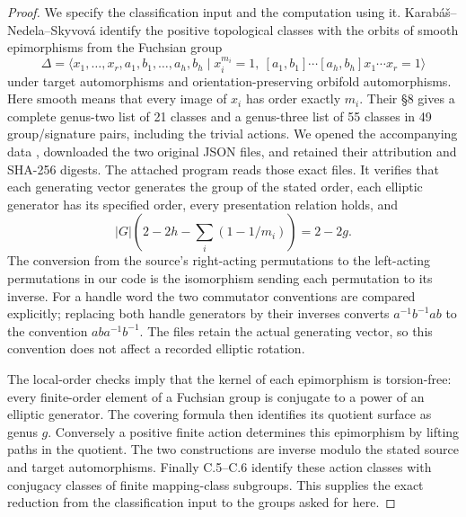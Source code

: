 \begin{proof}
We specify the classification input and the computation using it.
Karab\'a\v{s}--Nedela--Skyvov\'a
\cite[Theorem 2.2, Corollary 2.3, Theorem 4.1 and \S8]{R-KNS}
identify the positive topological classes with the orbits of smooth
epimorphisms from the Fuchsian group
\[
 \Delta=\langle x_1,\ldots,x_r,a_1,b_1,\ldots,a_h,b_h\mid
 x_i^{m_i}=1,\ [a_1,b_1]\cdots[a_h,b_h]x_1\cdots x_r=1\rangle
\]
under target automorphisms and orientation-preserving orbifold
automorphisms. Here smooth means that every image of $x_i$ has
order exactly $m_i$. Their \S8 gives a complete genus-two list
of 21 classes and a genus-three list of 55 classes in 49
group/signature pairs, including the trivial actions. We opened
the accompanying data \cite{R-KNSData}, downloaded the two original
JSON files, and retained their attribution and SHA-256 digests.
The attached program reads those exact files. It verifies that
each generating vector generates the group of the stated order,
each elliptic generator has its specified order, every presentation
relation holds, and
\[
 |G|\left(2-2h-\sum_i(1-1/m_i)\right)=2-2g.
\]
The conversion from the source's right-acting permutations to the
left-acting permutations in our code is the isomorphism sending
each permutation to its inverse. For a handle word the two
commutator conventions are compared explicitly; replacing both
handle generators by their inverses converts $a^{-1}b^{-1}ab$
to the convention $aba^{-1}b^{-1}$. The files retain the actual
generating vector, so this convention does not affect a recorded
elliptic rotation.

The local-order checks imply that the kernel of each epimorphism
is torsion-free: every finite-order element of a Fuchsian group
is conjugate to a power of an elliptic generator. The covering
formula then identifies its quotient surface as genus $g$.
Conversely a positive finite action determines this epimorphism
by lifting paths in the quotient. The two constructions are
inverse modulo the stated source and target automorphisms.
Finally C.5--C.6 identify these action classes with conjugacy
classes of finite mapping-class subgroups. This supplies the
exact reduction from the classification input to the groups
asked for here.


\end{proof}

